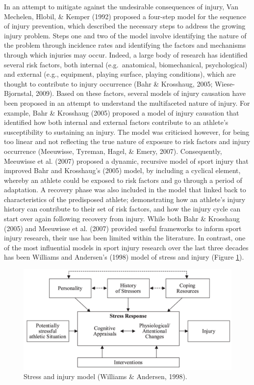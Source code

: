 \documentclass[
  english,
  man,floatsintext]{apa6}
\begin{document}
In an attempt to mitigate against the undesirable consequences of injury, Van Mechelen, Hlobil, \& Kemper (1992) proposed a four-step model for the sequence of injury prevention, which described the necessary steps to address the growing injury problem.
Steps one and two of the model involve identifying the nature of the problem through incidence rates and identifying the factors and mechanisms through which injuries may occur.
Indeed, a large body of research has identified several risk factors, both internal (e.g.~anatomical, biomechanical, psychological) and external (e.g., equipment, playing surface, playing conditions), which are thought to contribute to injury occurrence (Bahr \& Krosshaug, 2005; Wiese-Bjornstal, 2009).
Based on these factors, several models of injury causation have been proposed in an attempt to understand the multifaceted nature of injury.
For example, Bahr \& Krosshaug (2005) proposed a model of injury causation that identified how both internal and external factors contribute to an athlete's susceptibility to sustaining an injury.
The model was criticised however, for being too linear and not reflecting the true nature of exposure to risk factors and injury occurrence (Meeuwisse, Tyreman, Hagel, \& Emery, 2007).
Consequently, Meeuwisse et al. (2007) proposed a dynamic, recursive model of sport injury that improved Bahr and Krosshaug's (2005) model, by including a cyclical element, whereby an athlete could be exposed to risk factors and go through a period of adaptation.
A recovery phase was also included in the model that linked back to characteristics of the predisposed athlete; demonstrating how an athlete's injury history can contribute to their set of risk factors, and how the injury cycle can start over again following recovery from injury.
While both Bahr \& Krosshaug (2005) and Meeuwisse et al. (2007) provided useful frameworks to inform sport injury research, their use has been limited within the literature.
In contrast, one of the most influential models in sport injury research over the last three decades has been Williams and Andersen's (1998) model of stress and injury (Figure \ref{fig:wamodel}).

\begin{figure}[H]

{\centering \includegraphics[width=5.67in]{figs/lit/wamodel} 

}

\caption{Stress and injury model (Williams \& Andersen, 1998).}\label{fig:wamodel}
\end{figure}
\end{document}
